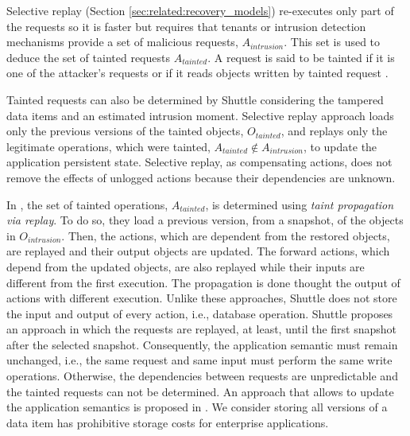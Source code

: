 Selective replay (Section \ref{sec:related:recovery_models}) re-executes only part of the requests so it is faster but requires that tenants or intrusion detection mechanisms provide a set of malicious requests, $A_{intrusion}$. This set is used to deduce the set of tainted requests $A_{tainted}$. A request is said to be tainted if it is one of the attacker’s requests or if it reads objects written by tainted request \cite{taser,itdb,phoenix}. 

Tainted requests can also be determined by Shuttle considering the tampered data items and an estimated intrusion moment. Selective replay approach loads only the previous versions of the tainted objects, $O_{tainted}$, and replays only the legitimate operations, which were tainted, $A_{tainted} \notin A_{intrusion}$, to update the application persistent state. Selective replay, as compensating actions, does not remove the effects of unlogged actions because their dependencies are unknown. 

In \cite{goel,retro}, the set of tainted operations, $A_{tainted}$, is determined using \textit{taint propagation via replay}. To do so, they load a previous version, from a snapshot, of the objects in $O_{intrusion}$. Then, the actions, which are dependent from the restored objects, are replayed and their output objects are updated. The forward actions, which depend from the updated objects, are also replayed while their inputs are different from the first execution. The propagation is done thought the output of actions with different execution.
Unlike these approaches, Shuttle does not store the input and output of every action, i.e., database operation. Shuttle proposes an approach in which the requests are replayed, at least, until the first snapshot after the selected snapshot. Consequently, the application semantic must remain unchanged, i.e., the same request and same input must perform the same write operations. Otherwise, the dependencies between requests are unpredictable and the tainted requests can not be determined. An approach that allows to update the application semantics is proposed in \cite{warp}. We consider storing all versions of a data item has prohibitive storage costs for enterprise applications.\\

